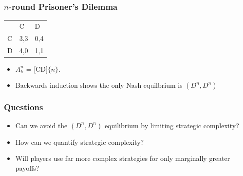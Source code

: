 \documentclass{beamer}
\begin{document}
\begin{frame}
	\frametitle{$n$-round Prisoner's Dilemma}
	\begin{table}[H]
		\centering
		\label{pdpayoffs}
		\begin{tabular}{lll}
			& C                        & D                        \\ \cline{2-3} 
			\multicolumn{1}{l|}{C} & \multicolumn{1}{l|}{3,3} & \multicolumn{1}{l|}{0,4} \\ \cline{2-3} 
			\multicolumn{1}{l|}{D} & \multicolumn{1}{l|}{4,0} & \multicolumn{1}{l|}{1,1} \\ \cline{2-3} 
		\end{tabular}
	\end{table}
	
	\begin{itemize}
		\item $A^n_k$ = $\lbrack \text{CD} \rbrack \lbrace n \rbrace$.
		\item Backwards induction shows the only Nash equilbrium is $(D^n, D^n)$
	\end{itemize}
	
	
	
	
\end{frame}

\begin{frame}
	\frametitle{Questions}
		\begin{itemize}
			\item Can we avoid the $(D^n, D^n)$ equilibrium by limiting strategic complexity?
			\item How can we quantify strategic complexity?
			\item Will players use far more complex strategies for only marginally greater payoffs?
		\end{itemize}
\end{frame}
\end{document}
